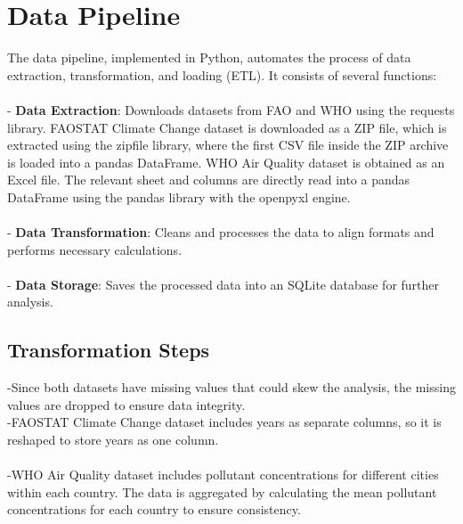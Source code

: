 \documentclass{article}
\begin{document}
\section{Data Pipeline}

The data pipeline, implemented in Python, automates the process of data extraction, transformation, and loading (ETL). It consists of several functions: \\\\
- \textbf{Data Extraction}: Downloads datasets from FAO and WHO using the requests library. FAOSTAT Climate Change dataset is downloaded as a ZIP file, which is extracted using the zipfile library, where the first CSV file inside the ZIP archive is loaded into a pandas DataFrame. WHO Air Quality dataset is obtained as an Excel file. The relevant sheet and columns are directly read into a pandas DataFrame using the pandas library with the openpyxl engine. \\\\
- \textbf{Data Transformation}: Cleans and processes the data to align formats and performs necessary calculations.\\\\
- \textbf{Data Storage}: Saves the processed data into an SQLite database for further analysis.

\subsection{Transformation Steps}
-Since both datasets have missing values that could skew the analysis, the missing values are dropped to ensure data integrity.\\ 
-FAOSTAT Climate Change dataset includes years as separate columns, so it is reshaped to store years as one column.\\\\
-WHO Air Quality dataset includes pollutant concentrations for different cities within each country. The data is aggregated by calculating the mean pollutant concentrations for each country to ensure consistency.
\vspace{1em}
\end{document}

